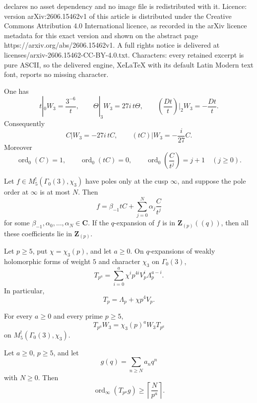 \documentclass[10pt,a4paper]{amsart}
\DeclareMathOperator{\ord}{ord}
\newcommand{\C}{\mathbf C}
\newcommand{\G}{\Gamma_0(3)}
\newcommand{\Up}{\Lambda_p}
\newcommand{\Vp}{V_p}
\newcommand{\Z}{\mathbf Z}
\begin{document}
declares no asset dependency and no image file is redistributed with it. Licence: version arXiv:2606.15462v1 of this article is distributed under the Creative Commons Attribution 4.0 International licence, as recorded in the arXiv licence metadata for this exact version and shown on the abstract page https://arxiv.org/abs/2606.15462v1. A full rights notice is delivered at licenses/arxiv-2606.15462-CC-BY-4.0.txt. Characters: every retained excerpt is pure ASCII, so the delivered engine, XeLaTeX with its default Latin Modern text font, reports no missing character.
\begin{proposition}\label{prop:fricke-C}
One has
\[
 t|_0W_3=\frac{3^{-6}}{t},
 \qquad
 \Theta|_3W_3=27i\,t\Theta,
 \qquad
 \left(\frac{Dt}{t}\right)\!\Big|_2W_3=-\frac{Dt}{t}.
\]
Consequently
\[
 C|W_3=-27i\,tC,
 \qquad
 (tC)|W_3=-\frac{i}{27}C.
\]
Moreover
\[
 \ord_0(C)=1,
 \qquad
 \ord_0(tC)=0,
 \qquad
 \ord_0\left(\frac{C}{t^j}\right)=j+1\quad(j\ge0).
\]
\end{proposition}

\begin{proposition}\label{prop:polelowering}
Let $f\in M_5^!(\G,\chi_3)$ have poles only at the cusp $\infty$, and suppose the pole order at $\infty$ is at most $N$.  Then
\[
 f=\beta_{-1}tC+\sum_{j=0}^{N}\alpha_j\frac{C}{t^j}
\]
for some $\beta_{-1},\alpha_0,\ldots,\alpha_N\in\C$.
If the $q$-expansion of $f$ is in $\Z_{(p)}((q))$, then all these coefficients lie in $\Z_{(p)}$.
\end{proposition}

\begin{proposition}\label{prop:hecke-prime-power}
Let $p\ge5$, put $\chi=\chi_3(p)$, and let $a\ge0$.  On $q$-expansions of weakly holomorphic forms of weight $5$ and character $\chi_3$ on $\G$,
\[
 T_{p^a}=
 \sum_{i=0}^{a}\chi^i p^{4i}\Vp^i\Up^{a-i}.
\]
In particular,
\[
 T_p=\Up+\chi p^4\Vp.
\]
\end{proposition}

\begin{proposition}\label{prop:fricke-hecke}
For every $a\ge0$ and every prime $p\ge5$,
\[
 T_{p^a}W_3=\chi_3(p)^a W_3T_{p^a}
\]
on $M_5^!(\G,\chi_3)$.
\end{proposition}

\begin{lemma}\label{lem:order-estimate}
Let $a\ge0$, $p\ge5$, and let
\[
 g(q)=\sum_{n\ge N}a_nq^n
\]
with $N\ge0$.  Then
\[
 \ord_\infty(T_{p^a}g)\ge\left\lceil\frac{N}{p^a}\right\rceil.
\]
\end{lemma}
\end{document}
